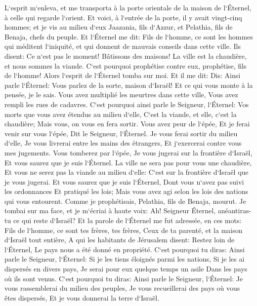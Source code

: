 \verse L`esprit m`enleva, et me transporta à la porte orientale de la maison de l`Éternel, à celle qui regarde l`orient. Et voici, à l`entrée de la porte, il y avait vingt-cinq hommes; et je vis au milieu d`eux Jaazania, fils d`Azzur, et Pelathia, fils de Benaja, chefs du peuple. 
\verse Et l`Éternel me dit: Fils de l`homme, ce sont les hommes qui méditent l`iniquité, et qui donnent de mauvais conseils dans cette ville. 
\verse Ils disent: Ce n`est pas le moment! Bâtissons des maisons! La ville est la chaudière, et nous sommes la viande. 
\verse C`est pourquoi prophétise contre eux, prophétise, fils de l`homme! 
\verse Alors l`esprit de l`Éternel tomba sur moi. Et il me dit: Dis: Ainsi parle l`Éternel: Vous parlez de la sorte, maison d`Israël! Et ce qui vous monte à la pensée, je le sais. 
\verse Vous avez multiplié les meurtres dans cette ville, Vous avez rempli les rues de cadavres. 
\verse C`est pourquoi ainsi parle le Seigneur, l`Éternel: Vos morts que vous avez étendus au milieu d`elle, C`est la viande, et elle, c`est la chaudière; Mais vous, on vous en fera sortir. 
\verse Vous avez peur de l`épée, Et je ferai venir sur vous l`épée, Dit le Seigneur, l`Éternel. 
\verse Je vous ferai sortir du milieu d`elle, Je vous livrerai entre les mains des étrangers, Et j`exercerai contre vous mes jugements. 
\verse Vous tomberez par l`épée, Je vous jugerai sur la frontière d`Israël, Et vous saurez que je suis l`Éternel. 
\verse La ville ne sera pas pour vous une chaudière, Et vous ne serez pas la viande au milieu d`elle: C`est sur la frontière d`Israël que je vous jugerai. 
\verse Et vous saurez que je suis l`Éternel, Dont vous n`avez pas suivi les ordonnances Et pratiqué les lois; Mais vous avez agi selon les lois des nations qui vous entourent. 
\verse Comme je prophétisais, Pelathia, fils de Benaja, mourut. Je tombai sur ma face, et je m`écriai à haute voix: Ah! Seigneur Éternel, anéantiras-tu ce qui reste d`Israël? 
\verse Et la parole de l`Éternel me fut adressée, en ces mots: 
\verse Fils de l`homme, ce sont tes frères, tes frères, Ceux de ta parenté, et la maison d`Israël tout entière, A qui les habitants de Jérusalem disent: Restez loin de l`Éternel, Le pays nous a été donné en propriété. 
\verse C`est pourquoi tu diras: Ainsi parle le Seigneur, l`Éternel: Si je les tiens éloignés parmi les nations, Si je les ai dispersés en divers pays, Je serai pour eux quelque temps un asile Dans les pays où ils sont venus. 
\verse C`est pourquoi tu diras: Ainsi parle le Seigneur, l`Éternel: Je vous rassemblerai du milieu des peuples, Je vous recueillerai des pays où vous êtes dispersés, Et je vous donnerai la terre d`Israël. 
